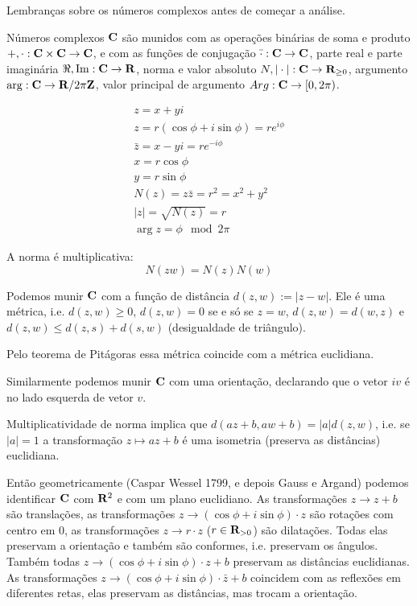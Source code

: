
Lembranças sobre os números complexos antes de começar a análise.

Números complexos $\mathbf{C}$ são munidos com as operações binárias
de soma e produto $+,\cdot : \mathbf{C} \times \mathbf{C} \to \mathbf{C}$,
e com as funções de 
conjugação $\bar{\cdot} : \mathbf{C} \to \mathbf{C}$,
parte real e parte imaginária $\Re,\operatorname{Im} : \mathbf{C} \to \mathbf{R}$,
norma e valor absoluto $N,|\cdot| : \mathbf{C} \to \mathbf{R}_{\geq 0}$,
argumento $\arg : \mathbf{C} \to \mathbf{R}/2\pi\mathbf{Z}$,
valor principal de argumento $Arg : \mathbf{C} \to [0,2\pi)$.

\begin{gather}
z = x + y i \\
z = r (\cos \phi + i \sin \phi) = r e^{i\phi}\\
\bar{z} = x - y i = r e^{-i\phi} \\
x = r \cos \phi \\
y = r \sin \phi \\
N(z) = z \bar{z} = r^2 = x^2+y^2 \\
|z| = \sqrt{N(z)} = r \\
\arg z = \phi \mod 2\pi
\end{gather}

A norma é multiplicativa:
$$ N(zw) = N(z) N(w) $$

Podemos munir $\mathbf{C}$ com a função de distância $d(z,w) := |z-w|$.
Ele é uma métrica, i.e. $d(z,w) \geq 0$, $d(z,w) = 0$ se e só se $z=w$,
$d(z,w) = d(w,z)$ e $d(z,w) \leq d(z,s) + d(s,w)$ (desigualdade de triângulo).

Pelo teorema de Pitágoras essa métrica coincide com a métrica euclidiana.

Similarmente podemos munir $\mathbf{C}$ com uma orientação, declarando que o vetor $i v$ é no lado esquerda de vetor $v$.

Multiplicatividade de norma implica que $d(az+b,aw+b) = |a| d(z,w)$, i.e. se $|a|=1$ a transformação $z\mapsto az+b$
é uma isometria (preserva as distâncias) euclidiana.

Então geometricamente (Caspar Wessel 1799, e depois Gauss e Argand) 
podemos identificar $\mathbf{C}$ com $\mathbf{R}^2$ e com um plano euclidiano.
As transformações $z \to z + b$ são translações,
as transformações $z \to (\cos \phi + i \sin \phi) \cdot z$ são rotações com centro em $0$,
as transformações $z \to r \cdot z$ ($r\in\mathbf{R}_{>0}$) são dilatações. 
Todas elas preservam a orientação e também são conformes, i.e. preservam os ângulos.
Também todas $z \to (\cos \phi + i \sin \phi) \cdot z + b$ preservam as distâncias euclidianas.
As transformações $z \to (\cos \phi + i \sin \phi) \cdot \bar{z} + b$ coincidem com as reflexões
em diferentes retas, elas preservam as distâncias, mas trocam a orientação.

